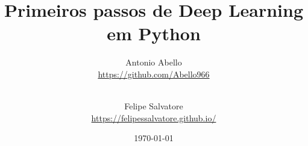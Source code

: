 \title{Primeiros passos de Deep Learning em Python}
\date{\today}

\author{
  Antonio Abello\\
  \url{https://github.com/Abello966}\\\vspace{0.4 cm}
  \and\\ 
  Felipe Salvatore\\
  \url{https://felipessalvatore.github.io/}
  \vspace{0.4 cm}
}

